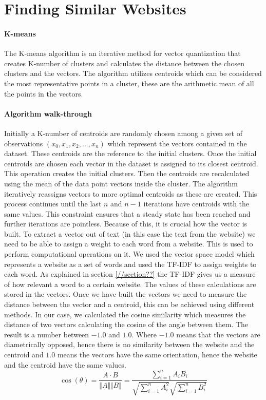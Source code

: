 \section{Finding Similar Websites}
\paragraph{K-means}
The K-means algorithm is an iterative method for vector quantization that creates K-number of clusters and calculates the distance between the chosen clusters and the vectors. 
The algorithm utilizes centroids which can be considered the most representative points in a cluster, these are the arithmetic mean of all the points in the vectors.
\paragraph{Algorithm walk-through}
Initially a K-number of centroids are randomly chosen among a given set of observations $(x_0,x_1,x_2,...,x_n)$ which represent the vectors contained in the dataset. These centroids are the reference to the initial clusters. Once the initial centroids are chosen each vector in the dataset is assigned to its closest centroid. This operation creates the initial clusters. Then the centroids are recalculated using the mean of the data point vectors inside the cluster. 
The algorithm iteratively reassigns vectors to more optimal centroids as these are created.
This process continues until the last $n$ and $n-1$ iterations have centroids with the same values. 
This constraint ensures that a steady state has been reached and further iterations are pointless.
Because of this, it is crucial how the vector is built. To extract a vector out of text (in this case the text from the website) we need to be able to assign a weight to each word from a website. This is used to perform computational operations on it. We used the vector space model which represents a website as a set of words and used the TF-IDF to assign weights to each word. As explained in section \ref{//section??} the TF-IDF gives us a measure of how  relevant a word to a certain website. The values of these calculations are stored in the vectors.
Once we have built the vectors we need to measure the distance between the vector and a centroid, this can be achieved using different methods. In our case, we calculated the cosine similarity which measures the distance of two vectors calculating the cosine of the angle between them. The result is a number between $-1.0$ and $1.0$. Where $-1.0$ means that the vectors are diametrically opposed, hence there is no similarity between the website and the centroid and $1.0$ means the vectors have the same orientation, hence the website and the centroid have the same values.
$$
\cos(\theta) = \frac{A \cdot B}{\Vert A \Vert \Vert B \Vert} = \frac{\sum_{i=1}^n A_iB_i}{\sqrt{\sum_{i=1}^n A_i^2}{\sqrt{\sum_{i=1}^n B_i^2}}}
$$
